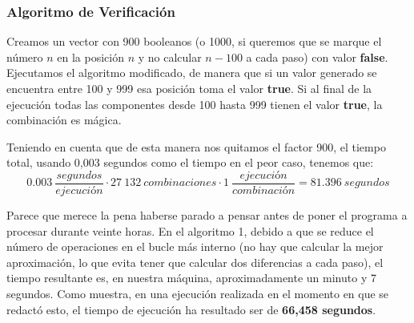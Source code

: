 \subsubsection{Algoritmo de Verificación}
Creamos un vector con 900 booleanos (o 1000, si queremos que se marque el número
$n$ en la posición $n$ y no calcular $n-100$ a cada paso) con valor \textbf{false}.
Ejecutamos el algoritmo modificado, de manera que si un valor generado se encuentra
entre 100 y 999 esa posición toma el valor \textbf{true}. Si al final de la
ejecución todas las componentes desde 100 hasta 999 tienen el valor \textbf{true},
la combinación es mágica. 

Teniendo en cuenta que de esta manera nos quitamos el factor 900, el tiempo total,
usando 0,003 segundos como el tiempo en el peor caso, tenemos que:
$$ 0.003\ \frac{segundos}{ejecución} \cdot 27\ 132\ combinaciones \cdot 1\  \frac{ejecución}{combinación}=81.396\ segundos$$

Parece que merece la pena haberse parado a pensar antes de poner el programa a
procesar durante veinte horas. En el algoritmo 1, debido a que se reduce el número
de operaciones en el bucle más interno (no hay que calcular la mejor aproximación,
lo que evita tener que calcular dos diferencias a cada paso), el tiempo resultante
es, en nuestra máquina, aproximadamente un minuto y 7 segundos. Como muestra,
en una ejecución realizada en el momento en que se redactó esto, el tiempo de
ejecución ha resultado ser de \textbf{66,458 segundos}.